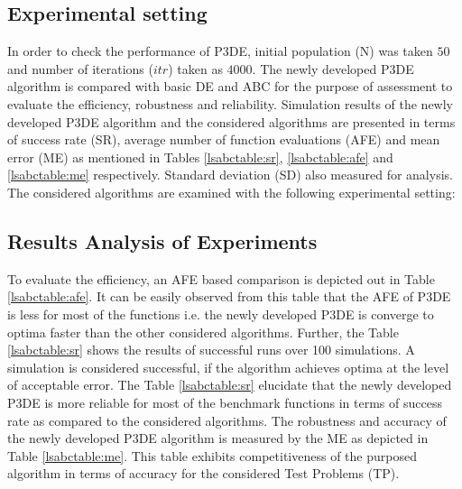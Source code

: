 \documentclass{svproc}
\begin{document}
\subsection{Experimental setting}\label{sec:setting}
In order to check the performance of P3DE, initial population (N) was taken $50$ and number of iterations ($itr$) taken as $4000$. The newly developed P3DE algorithm is compared with basic DE \cite{storn1995differential} and ABC \cite{karaboga2005idea} for the purpose of assessment to evaluate the efficiency, robustness and reliability. Simulation results of the newly developed P3DE algorithm and the considered algorithms are presented in terms of success rate (SR), average number of function evaluations (AFE) and mean error (ME) as mentioned in Tables \ref{lsabctable:sr}, \ref{lsabctable:afe} and \ref{lsabctable:me} respectively. Standard deviation (SD) also measured for analysis. The considered algorithms are examined with the following experimental setting:

\subsection{Results Analysis of Experiments}\label{sec:comp}
To evaluate the efficiency, an AFE based comparison is depicted out in Table \ref{lsabctable:afe}. It can be easily observed from this table that the AFE of P3DE is less for most of the functions i.e. the newly developed P3DE is converge to optima faster than the other considered algorithms. Further, the Table \ref{lsabctable:sr} shows the results of successful runs over 100 simulations. A simulation is considered successful, if the algorithm achieves optima at the level of acceptable error. The Table \ref{lsabctable:sr} elucidate that the newly developed P3DE is more reliable for most of the benchmark functions in terms of success rate as compared to the considered algorithms. The robustness and accuracy of the newly developed P3DE algorithm is measured by the ME as depicted in Table \ref{lsabctable:me}. This table exhibits competitiveness of the purposed algorithm in terms of accuracy for the considered Test Problems (TP).
\end{document}
